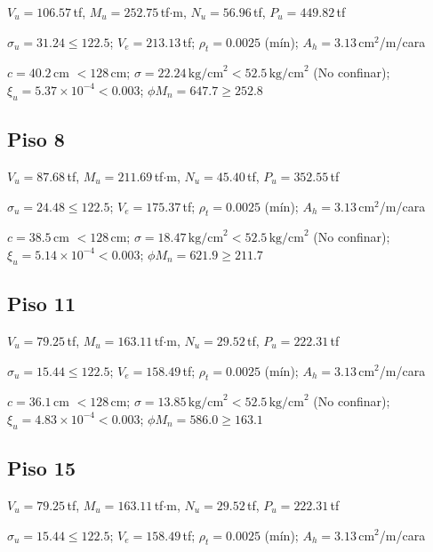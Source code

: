 $V_u=106.57$\,tf,\; $M_u=252.75$\,tf$\cdot$m,\;
$N_u=56.96$\,tf,\; $P_u=449.82$\,tf

$\sigma_u=31.24\leq122.5$;\quad
$V_e=213.13$\,tf;\;
$\rho_t=0.0025$ (mín);\;
$A_h=3.13$\,cm$^2$/m/cara

$c=40.2$\,cm $<128$\,cm;\quad
$\sigma=22.24\,\text{kg/cm}^2<52.5\,\text{kg/cm}^2$
(No confinar);\quad
$\xi_u=5.37\times10^{-4}<0.003$;\quad
$\phi M_n=647.7\geq252.8$

\subsection{Piso 8}

$V_u=87.68$\,tf,\; $M_u=211.69$\,tf$\cdot$m,\;
$N_u=45.40$\,tf,\; $P_u=352.55$\,tf

$\sigma_u=24.48\leq122.5$;\quad
$V_e=175.37$\,tf;\;
$\rho_t=0.0025$ (mín);\;
$A_h=3.13$\,cm$^2$/m/cara

$c=38.5$\,cm $<128$\,cm;\quad
$\sigma=18.47\,\text{kg/cm}^2<52.5\,\text{kg/cm}^2$
(No confinar);\quad
$\xi_u=5.14\times10^{-4}<0.003$;\quad
$\phi M_n=621.9\geq211.7$

\subsection{Piso 11}

$V_u=79.25$\,tf,\; $M_u=163.11$\,tf$\cdot$m,\;
$N_u=29.52$\,tf,\; $P_u=222.31$\,tf

$\sigma_u=15.44\leq122.5$;\quad
$V_e=158.49$\,tf;\;
$\rho_t=0.0025$ (mín);\;
$A_h=3.13$\,cm$^2$/m/cara

$c=36.1$\,cm $<128$\,cm;\quad
$\sigma=13.85\,\text{kg/cm}^2<52.5\,\text{kg/cm}^2$
(No confinar);\quad
$\xi_u=4.83\times10^{-4}<0.003$;\quad
$\phi M_n=586.0\geq163.1$

\subsection{Piso 15}

$V_u=79.25$\,tf,\; $M_u=163.11$\,tf$\cdot$m,\;
$N_u=29.52$\,tf,\; $P_u=222.31$\,tf

$\sigma_u=15.44\leq122.5$;\quad
$V_e=158.49$\,tf;\;
$\rho_t=0.0025$ (mín);\;
$A_h=3.13$\,cm$^2$/m/cara

